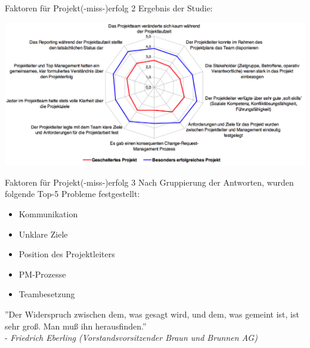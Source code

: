 \documentclass[12pt]{beamer}
\begin{document}
	\begin{frame}{Faktoren für Projekt(-miss-)erfolg 2}
	Ergebnis der Studie:
		\begin{center}
			\includegraphics[width=1\textwidth]{images/studie_erfolgsfaktoren}
		\end{center}

	\end{frame}

	\begin{frame}{Faktoren für Projekt(-miss-)erfolg 3}
		Nach Gruppierung der Antworten, wurden folgende Top-5 Probleme festgestellt:
		\begin{itemize}
			\item{Kommunikation}
			\item{Unklare Ziele}
			\item{Position des Projektleiters}
			\item{PM-Prozesse}
			\item{Teambesetzung}
		\end{itemize}

	\end{frame}
	

	\thispagestyle{empty}
	\begin{frame}
		''Der Widerspruch zwischen dem, was gesagt wird, und dem, was gemeint ist, ist sehr groß. Man muß ihn herausfinden.'' \\ 
		- \textit{Friedrich Eberling (Vorstandsvorsitzender Braun und Brunnen AG)}
	\end{frame}
\end{document}
